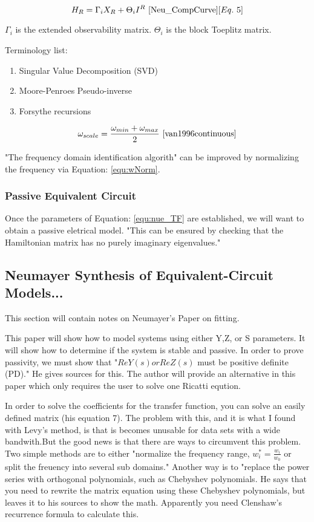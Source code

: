 \begin{equation}
\label{equ:MatrixTF}
H_R = \Gamma _i X_R + \Theta _i I^R
~\cite{Neu_CompCurve}[Eq.~5]
\end{equation}

$\Gamma _i$ is the extended observability matrix.
$\Theta _i$ is the block Toeplitz matrix.

Terminology list:
\begin{enumerate}
    \item Singular Value Decomposition (SVD)
    \item Moore-Penroes Pseudo-inverse
    \item Forsythe recursions \cite{van1996continuous}
\end{enumerate}

\begin{equation}
\label{equ:wNorm}
\omega _{scale} = \frac{\omega _{min} + \omega _{max}}{2}
~\cite{van1996continuous}
\end{equation}

"The frequency domain identification algorith" can be improved by normalizing the frequency via Equation: \eqref{equ:wNorm}.

\subsubsection{Passive Equivalent Circuit}
Once the parameters of Equation: \eqref{equ:nue_TF} are established, we will want to obtain a passive eletrical model. "This can be ensured by checking that the Hamiltonian matrix has no purely imaginary eigenvalues.\cite{boyd1989bisection}\cite{Neu_CompCurve}"


\subsection{Neumayer Synthesis of Equivalent-Circuit Models...}
This section will contain notes on Neumayer's Paper on fitting.\cite{neu_ModelSynth}

This paper will show how to model systems using either Y,Z, or S parameters. It will show how to determine if the system is stable and passive. In order to prove passivity, we must show that "$Re{Y(s)} or Re{Z(s)}$ must be positive definite (PD)." He gives sources for this. The author will provide an alternative in this paper which only requires the user to solve one Ricatti eqution.

In order to solve the coefficients for the transfer function, you can solve an easily defined matrix (his equation 7). The problem with this, and it is what I found with Levy's method, is that is becomes unusable for data sets with a wide bandwith.But the good news is that there are ways to circumvent this problem. Two simple methods are to either "normalize the frequency range, $w_i ^* = \frac{w_i}{w_0}$ or split the freuency into several sub domains." Another way is to "replace the power series with orthogonal polynomials, such as Chebyshev polynomials.\cite{beyene_uwave} He says that you need to rewrite the matrix equation using these Chebyshev polynomials, but leaves it to his sources to show the math. Apparently you need Clenshaw's recurrence formula to calculate this.

